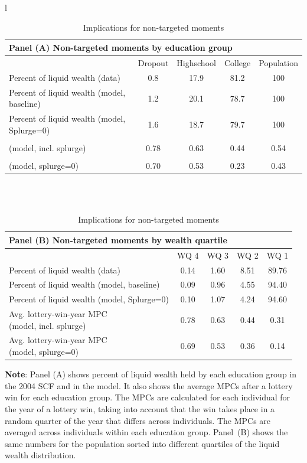 \documentclass[\econtexRoot/HAFiscal]{subfiles}
\begin{document}
\begin{table}[th]
	\begin{center}
		\begin{tabular}{l}
			\begin{tabular}{lcccc}
				\multicolumn{5}{l}{Panel (A) Non-targeted moments by education group} \\ \midrule
				& Dropout & Highschool & College & Population \\ \midrule
				Percent of liquid wealth (data) & 0.8 & 17.9 & 81.2 & 100 \\
				Percent of liquid wealth (model, baseline) & 1.2 & 20.1 & 78.7 & 100 \\
				Percent of liquid wealth (model, Splurge=0) & 1.6 & 18.7 & 79.7 & 100 \\
				\makecell[l]{Avg. lottery-win-year MPC \\ (model, incl. splurge)} & 0.78 & 0.63 & 0.44 & 0.54 \\ 
				\makecell[l]{Avg. lottery-win-year MPC \\ (model, splurge=0)} & 0.70 & 0.53 & 0.23 & 0.43
				\\ \bottomrule 
			\end{tabular} \\ \\ 
			
			\begin{tabular}{lcccc}
				\multicolumn{5}{l}{Panel (B) Non-targeted moments by wealth quartile} \\ \midrule
				& WQ 4 & WQ 3 & WQ 2 & WQ 1 \\ \midrule
				Percent of liquid wealth (data) & 0.14 & 1.60 & 8.51 & 89.76 \\
				Percent of liquid wealth (model, baseline) & 0.09 & 0.96 & 4.55 & 94.40 \\
				Percent of liquid wealth (model, Splurge=0) & 0.10 & 1.07 & 4.24 & 94.60 \\
				\makecell[l]{Avg. lottery-win-year MPC \\ (model, incl. splurge)} & 0.78 & 0.63 & 0.44 & 0.31 \\
				\makecell[l]{Avg. lottery-win-year MPC \\ (model, splurge=0)} & 0.69 & 0.53 & 0.36 & 0.14
				\\ \bottomrule 
			\end{tabular}
		\end{tabular}
		\caption{Implications for non-targeted moments}
		\notinsubfile{\label{tab:nonTargetedMoments_wSplZero}}
		\parbox{16cm}{\small \vspace{.15cm} \textbf{Note}: Panel (A) shows percent of liquid wealth held by each education group in the 2004 SCF and in the model.
It also shows the average MPCs after a lottery win for each education group.
The MPCs are calculated for each individual for the year of a lottery win, taking into account that the win takes place in a random quarter of the year that differs across individuals.
The MPCs are averaged across individuals within each education group.
Panel~(B) shows the same numbers for the population sorted into different quartiles of the liquid wealth distribution.\normalsize}
	\end{center}
\end{table}
\end{document}
